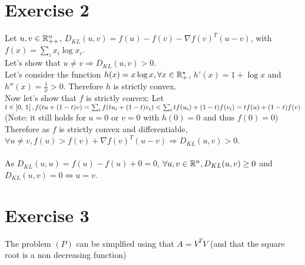 \documentclass{article}
\begin{document}
\section{Exercise 2}
Let $u, v \in \mathbb{R}^n_{++}$, $D_{KL}(u, v) = f(u) - f(v) - \nabla f(v)^T(u - v)$, with $f(x) = \sum_i x_i \log x_i$.
\\
Let's show that $u \neq v \Rightarrow D_{KL}(u, v) > 0$.
\\
Let's consider the function $h(x) = x \log x, \forall x \in \mathbb{R}^\star_+$, $h'(x) = 1 + \log x$
and $h''(x) = \frac{1}{x} > 0$. Therefore $h$ is strictly convex.
\\
Now let's show that $f$ is strictly convex:
Let $t \in \left]0,\, 1\right[, f(tu + (1-t)v) = \sum_i f(tu_i + (1-t)v_i) < \sum_i tf(u_i) + (1-t)f(v_i) = t f(u) + (1-t) f(v)$
\\
(Note: it still holds for $u = 0$ or $v = 0$ with $h(0) = 0$ and thus $f(0) = 0$)
\\
Therefore as $f$ is strictly convex and differentiable, $\forall u \neq v, f(u) > f(v) + \nabla f(v)^T(u -v) \Rightarrow D_{KL}(u, v) > 0$.
\\
\vspace{10px}
\\
As $D_{KL}(u, u) = f(u) - f(u) + 0 = 0$, $\forall u, v \in \mathbb{R}^n, D_{KL}(u, v) \ge 0$ and $D_{KL}(u, v) = 0 \Leftrightarrow u = v$.

\section{Exercise 3}
The problem $(P)$ can be simplfied using that $A = V^TV$ (and that the square root is a non decreasing function)
\end{document}
